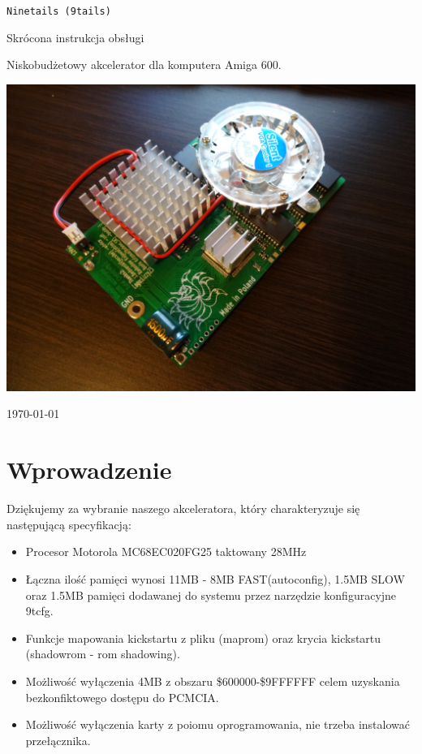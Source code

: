 \documentclass[10pt,a5paper]{article}
\begin{document}
\begin{titlepage}
\begin{center}

\huge
{\tt Ninetails (9tails)}

\Large
Skrócona instrukcja obsługi

\vspace*{2cm}

\normalsize
Niskobudżetowy akcelerator dla komputera Amiga 600.

\vspace*{2cm}
\includegraphics[scale=0.15]{ninetails-photo.jpg}
\vfill

\normalsize
\today

\end{center}
\end{titlepage}

\section*{Wprowadzenie}

Dziękujemy za wybranie naszego akceleratora, który charakteryzuje się następującą specyfikacją:

\begin{itemize}\itemsep0pt
	\item Procesor Motorola MC68EC020FG25 taktowany 28MHz
	\item Łączna ilość pamięci wynosi 11MB - 8MB FAST(autoconfig), 1.5MB SLOW oraz 1.5MB pamięci dodawanej do systemu przez narzędzie konfiguracyjne 9tcfg.
	\item Funkcje mapowania kickstartu z pliku (maprom) oraz krycia kickstartu (shadowrom - rom shadowing).
	\item Możliwość wyłączenia 4MB z obszaru \$600000-\$9FFFFFF celem uzyskania bezkonfiktowego dostępu do PCMCIA.
	\item Możliwość wyłączenia karty z poiomu oprogramowania, nie trzeba instalować przełącznika.
\end{itemize}
\end{document}
